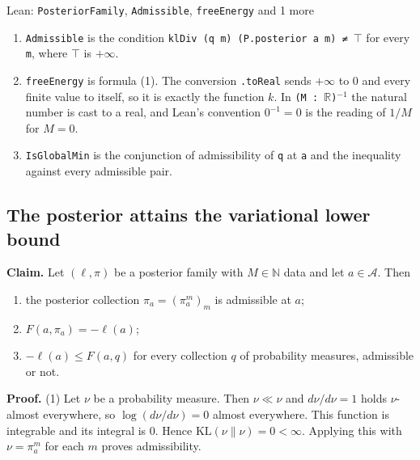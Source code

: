 \documentclass[11pt,a4paper]{report}
\begin{document}
\begin{leanbox}{Lean: \texttt{PosteriorFamily}, \texttt{Admissible}, \texttt{freeEnergy} and 1 more}
\begin{enumerate}


\item \texttt{Admissible} is the condition \texttt{kl\allowbreak{}Div (q m) (P.\allowbreak{}posterior a m) ≠ \ensuremath{\top}} for every \texttt{m}, where \texttt{\ensuremath{\top}} is \(+\infty\).

\item \texttt{free\allowbreak{}Energy} is formula (1). The conversion \texttt{.\allowbreak{}to\allowbreak{}Real} sends \(+\infty\) to \(0\) and every finite value to itself, so it is exactly the function \(k\). In \texttt{(M : \ensuremath{\mathbb R})\ensuremath{{}^{-1}}} the natural number is cast to a real, and Lean's convention \(0^{-1}=0\) is the reading of \(1/M\) for \(M=0\).

\item \texttt{Is\allowbreak{}Global\allowbreak{}Min} is the conjunction of admissibility of \texttt{q} at \texttt{a} and the inequality against every admissible pair.

\end{enumerate}
\end{leanbox}
\subsection{\texorpdfstring{The posterior attains the variational lower bound}{The posterior attains the variational lower bound}}


\textbf{Claim.} Let \((\ell,\pi)\) be a posterior family with \(M\in\mathbb N\) data and let \(a\in\mathcal A\). Then



\begin{enumerate}


\item the posterior collection \(\pi_a=(\pi_a^m)_m\) is admissible at \(a\);

\item \(F(a,\pi_a)=-\ell(a)\);

\item \(-\ell(a)\le F(a,q)\) for every collection \(q\) of probability measures, admissible or not.

\end{enumerate}



\textbf{Proof.} (1) Let \(\nu\) be a probability measure. Then \(\nu\ll\nu\) and \(d\nu/d\nu=1\) holds \(\nu\)-almost everywhere, so \(\log(d\nu/d\nu)=0\) almost everywhere. This function is integrable and its integral is \(0\). Hence \(\mathrm{KL}(\nu\|\nu)=0<\infty\). Applying this with \(\nu=\pi_a^m\) for each \(m\) proves admissibility.
\end{document}
